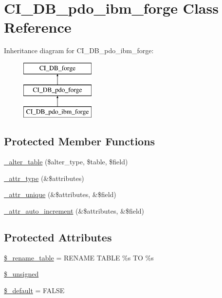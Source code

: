 \hypertarget{class_c_i___d_b__pdo__ibm__forge}{}\section{C\+I\+\_\+\+D\+B\+\_\+pdo\+\_\+ibm\+\_\+forge Class Reference}
\label{class_c_i___d_b__pdo__ibm__forge}
Inheritance diagram for C\+I\+\_\+\+D\+B\+\_\+pdo\+\_\+ibm\+\_\+forge\+:\begin{figure}[H]
\begin{center}
\leavevmode
\includegraphics[height=3.000000cm]{class_c_i___d_b__pdo__ibm__forge}
\end{center}
\end{figure}
\subsection*{Protected Member Functions}
\begin{DoxyCompactItemize}
\item 
\mbox{\hyperlink{class_c_i___d_b__pdo__ibm__forge_a41c6cae02f2fda8b429ad0afb9509426}{\+\_\+alter\+\_\+table}} (\$alter\+\_\+type, \$table, \$field)
\item 
\mbox{\hyperlink{class_c_i___d_b__pdo__ibm__forge_a8553be952084c6f7cdfff370a1d14f6b}{\+\_\+attr\+\_\+type}} (\&\$attributes)
\item 
\mbox{\hyperlink{class_c_i___d_b__pdo__ibm__forge_a7568a93ea53a7392a63fffe83bb7a090}{\+\_\+attr\+\_\+unique}} (\&\$attributes, \&\$field)
\item 
\mbox{\hyperlink{class_c_i___d_b__pdo__ibm__forge_a2a013a5932439c3c44f0dad3436525f7}{\+\_\+attr\+\_\+auto\+\_\+increment}} (\&\$attributes, \&\$field)
\end{DoxyCompactItemize}
\subsection*{Protected Attributes}
\begin{DoxyCompactItemize}
\item 
\mbox{\hyperlink{class_c_i___d_b__pdo__ibm__forge_a1a649e7cf9de16bcf932977b18bc91de}{\$\+\_\+rename\+\_\+table}} = \textquotesingle{}R\+E\+N\+A\+ME T\+A\+B\+LE \%s TO \%s\textquotesingle{}
\item 
\mbox{\hyperlink{class_c_i___d_b__pdo__ibm__forge_aae977ae6d61fa183f0b25422b6ddc31c}{\$\+\_\+unsigned}}
\item 
\mbox{\hyperlink{class_c_i___d_b__pdo__ibm__forge_aa119e1b4e3d00f47a7b83b7066087915}{\$\+\_\+default}} = F\+A\+L\+SE
\end{DoxyCompactItemize}
